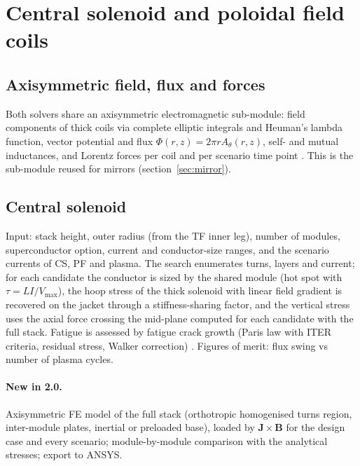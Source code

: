 \section{Central solenoid and poloidal field coils}
\label{sec:cspf}

\subsection{Axisymmetric field, flux and forces}
Both solvers share an axisymmetric electromagnetic sub-module: field
components of thick coils via complete elliptic integrals and Heuman's
lambda function, vector potential and flux
$\Phi(r,z)=2\pi r A_\theta(r,z)$, self- and mutual inductances, and
Lorentz forces per coil and per scenario time point
\cite{Giannini2023MADE}. This is the sub-module reused for mirrors
(section~\ref{sec:mirror}).

\subsection{Central solenoid}
Input: stack height, outer radius (from the TF inner leg), number of
modules, superconductor option, current and conductor-size ranges, and
the scenario currents of CS, PF and plasma. The search enumerates turns,
layers and current; for each candidate the conductor is sized by the
shared module (hot spot with $\tau=LI/V_\mathrm{max}$), the hoop stress of
the thick solenoid with linear field gradient is recovered on the jacket
through a stiffness-sharing factor, and the vertical stress uses the
axial force crossing the mid-plane computed for each candidate with the
full stack. Fatigue is assessed by fatigue crack growth (Paris law with
ITER criteria, residual stress, Walker correction)
\cite{Giannini2023MADE}. Figures of merit: flux swing vs number of
plasma cycles.
\paragraph{New in 2.0.} Axisymmetric FE model of the full stack (orthotropic
homogenised turns region, inter-module plates, inertial or preloaded
base), loaded by $\mathbf J\times\mathbf B$ for the design case and every
scenario; module-by-module comparison with the analytical stresses;
export to ANSYS. 


